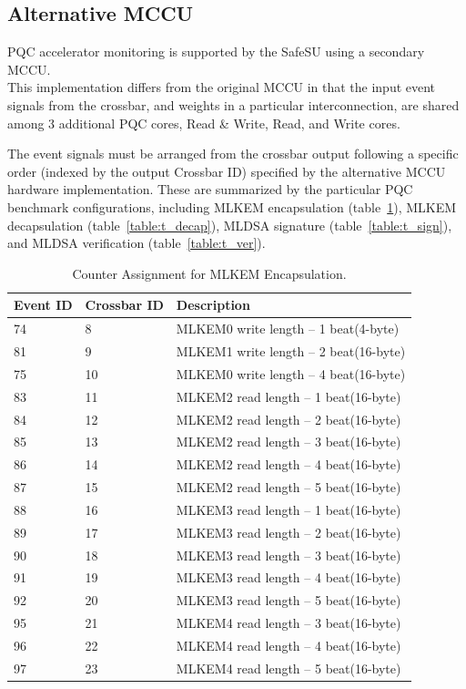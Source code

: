 \subsection{Alternative MCCU}
PQC accelerator monitoring is supported by the SafeSU using a secondary MCCU.\\
This implementation differs from the original MCCU in that the input event signals from the crossbar, and weights in a particular interconnection, are shared among 3 additional PQC cores, Read \& Write, Read, and Write cores.

The event signals must be arranged from the crossbar output following a specific order (indexed by the output Crossbar ID) specified by the alternative MCCU hardware implementation.
These are summarized by the particular PQC benchmark configurations, including MLKEM encapsulation (table~\ref{table:t_enc}), MLKEM decapsulation (table~\ref{table:t_decap}), MLDSA signature (table~\ref{table:t_sign}), and MLDSA verification (table~\ref{table:t_ver}).
\begin{table}[H]
	\caption{Counter Assignment for MLKEM Encapsulation. }
	\label{table:t_enc}
	\centering
		\begin{tabular}{|l|l|l|}
			\hline
			\textbf{Event ID} & \textbf{Crossbar ID} & \textbf{Description}\\
			\hline

74  & 8  & MLKEM0 write length -- 1 beat(4-byte)  \\
81  & 9  & MLKEM1 write length -- 2 beat(16-byte) \\
75  & 10 & MLKEM0 write length -- 4 beat(16-byte) \\
83  & 11 & MLKEM2 read  length -- 1 beat(16-byte) \\
84  & 12 & MLKEM2 read  length -- 2 beat(16-byte) \\
85  & 13 & MLKEM2 read  length -- 3 beat(16-byte) \\
86  & 14 & MLKEM2 read  length -- 4 beat(16-byte) \\
87  & 15 & MLKEM2 read  length -- 5 beat(16-byte) \\
88  & 16 & MLKEM3 read  length -- 1 beat(16-byte) \\
89  & 17 & MLKEM3 read  length -- 2 beat(16-byte) \\
90  & 18 & MLKEM3 read  length -- 3 beat(16-byte) \\
91  & 19 & MLKEM3 read  length -- 4 beat(16-byte) \\
92  & 20 & MLKEM3 read  length -- 5 beat(16-byte) \\
95  & 21 & MLKEM4 read  length -- 3 beat(16-byte) \\
96  & 22 & MLKEM4 read  length -- 4 beat(16-byte) \\
97  & 23 & MLKEM4 read  length -- 5 beat(16-byte) \\
	\hline
		\end{tabular}
\end{table}
